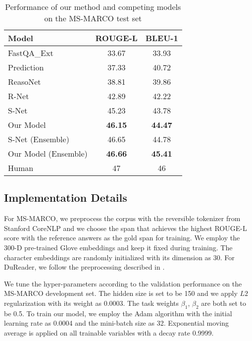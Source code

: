\begin{table*}[t!]
\centering
\begin{tabular}{lcc}
\hline
Model           & ROUGE-L & BLEU-1 \\ \hline
FastQA\_Ext \cite{fastqa}      & 33.67   & 33.93  \\
Prediction \cite{match-lstm}  & 37.33   & 40.72  \\
ReasoNet   \cite{reasonet}     & 38.81   & 39.86  \\
R-Net      \cite{rnet}     & 42.89   & 42.22  \\
S-Net      \cite{snet}     & 45.23   & 43.78  \\ 
Our Model          & \textbf{46.15}        &  \textbf{44.47}      \\ \hline
S-Net      (Ensemble)     & 46.65   & 44.78  \\
Our Model (Ensemble) & \textbf{46.66}        &  \textbf{45.41}      \\ \hline
Human           & 47      & 46   \\ \hline
\end{tabular}
\caption{Performance of our method and competing models on the MS-MARCO test set}
\label{tab:marco-results}
\end{table*}



\subsection{Implementation Details}
\label{sec:implementation}

For MS-MARCO, we preprocess the corpus with the reversible tokenizer from Stanford CoreNLP \cite{stanford-corenlp} and we choose the span that achieves the highest ROUGE-L score with the reference answers as the gold span for training. We employ the 300-D pre-trained Glove embeddings \cite{glove} and keep it fixed during training. The character embeddings are randomly initialized with its dimension as 30. For DuReader, we follow the preprocessing described in . 

We tune the hyper-parameters according to the validation performance on the MS-MARCO development set. The hidden size is set to be 150 and we apply $L2$ regularization with its weight as 0.0003. The task weights $\beta_{1}$, $\beta_{2}$ are both set to be 0.5. To train our model, we employ the Adam algorithm \cite{adam} with the initial learning rate as 0.0004 and the mini-batch size as 32. Exponential moving average is applied on all trainable variables with a decay rate 0.9999.

